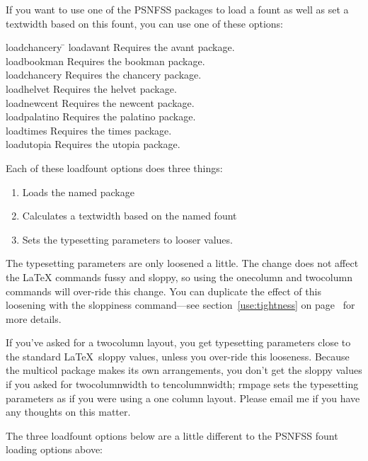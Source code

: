 \documentclass[11pt,loose,twoside,touchwider,longish,
                      noheaders,a4paper,notstdmargins]{report}
\newcommand*{\packname}[1]{{\sffamily #1}}
\DeclareRobustCommand*{\comname}[1]{{\ttfamily\makeatletter\bs #1\makeatother}}
\newcommand*{\classname}[1]{{\ttfamily #1}}
\newcommand*{\optname}[1]{{\ttfamily #1}}
\newcommand*{\rmpage}{\classname{rmpage}\xspace}
\begin{document}
If you want to use one of the \packname{PSNFSS} packages to load a
fount as well as set a \comname{textwidth} based on this fount, you
can use one of these options:
\begin{tabbing}
\optname{loadchancery}  \= \kill
\optname{loadavant}    \> Requires the \packname{avant} package. \\
\optname{loadbookman}  \> Requires the \packname{bookman} package.\\
\optname{loadchancery} \> Requires the \packname{chancery} package.\\
\optname{loadhelvet}   \> Requires the \packname{helvet} package.\\
\optname{loadnewcent}  \> Requires the \packname{newcent} package.\\
\optname{loadpalatino} \> Requires the \packname{palatino} package.\\
\optname{loadtimes}    \> Requires the \packname{times} package.\\
\optname{loadutopia}   \> Requires the \packname{utopia} package.
\end{tabbing}
Each of these \optname{loadfount} options does three things:
\begin{enumerate}
\item Loads the named package
\item Calculates a \comname{textwidth} based on the named fount
\item Sets the typesetting parameters to looser values.
\end{enumerate}

The typesetting parameters are only loosened a little.  The change
does not affect the \LaTeX{} commands \comname{fussy} and
\comname{sloppy}, so using the \comname{onecolumn} and
\comname{twocolumn} commands will over-ride this change.  You can
duplicate the effect of this loosening with the \comname{sloppiness}
command---see section~\ref{use:tightness} on
page~\pageref{use:tightness} for more details.

If you've asked for a \optname{twocolumn} layout, you get typesetting
parameters close to the standard \LaTeX\ sloppy values, unless you
over-ride this looseness.  Because the \packname{multicol} package
makes its own arrangements, you don't get the sloppy values if you
asked for \optname{twocolumnwidth} to \optname{tencolumnwidth};
\rmpage sets the typesetting parameters as if you were using a one
column layout.  Please email me if you have any thoughts on this
matter.

The three \optname{loadfount} options below are a little different to
the \packname{PSNFSS} fount loading options above:
\end{document}
